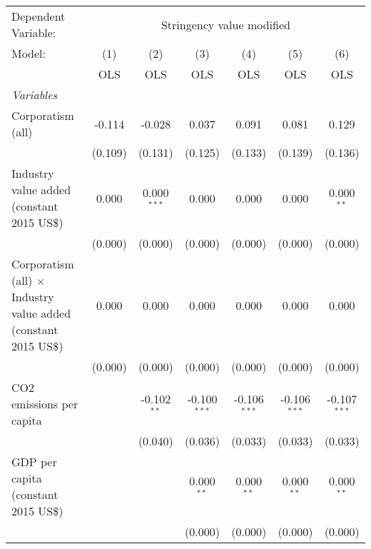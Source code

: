 
\begingroup
\centering
\begin{tabular}{lcccccc}
   \toprule
   Dependent Variable: & \multicolumn{6}{c}{Stringency value modified}\\
   Model:                                                                 & (1)     & (2)           & (3)            & (4)            & (5)            & (6)\\  
                                                                          &  OLS    & OLS           & OLS            & OLS            & OLS            & OLS\\  
   \midrule
   \emph{Variables}\\
   Corporatism (all)                                                      & -0.114  & -0.028        & 0.037          & 0.091          & 0.081          & 0.129\\   
                                                                          & (0.109) & (0.131)       & (0.125)        & (0.133)        & (0.139)        & (0.136)\\   
   Industry value added (constant 2015 US\$)                              & 0.000   & 0.000$^{***}$ & 0.000          & 0.000          & 0.000          & 0.000$^{**}$\\   
                                                                          & (0.000) & (0.000)       & (0.000)        & (0.000)        & (0.000)        & (0.000)\\   
   Corporatism (all) $\times$ Industry value added (constant 2015 US\$)   & 0.000   & 0.000         & 0.000          & 0.000          & 0.000          & 0.000\\   
                                                                          & (0.000) & (0.000)       & (0.000)        & (0.000)        & (0.000)        & (0.000)\\   
   CO2 emissions per capita                                               &         & -0.102$^{**}$ & -0.100$^{***}$ & -0.106$^{***}$ & -0.106$^{***}$ & -0.107$^{***}$\\   
                                                                          &         & (0.040)       & (0.036)        & (0.033)        & (0.033)        & (0.033)\\   
   GDP per capita (constant 2015 US\$)                                    &         &               & 0.000$^{**}$   & 0.000$^{**}$   & 0.000$^{**}$   & 0.000$^{**}$\\   
                                                                          &         &               & (0.000)        & (0.000)        & (0.000)        & (0.000)\\   

\end{tabular}

